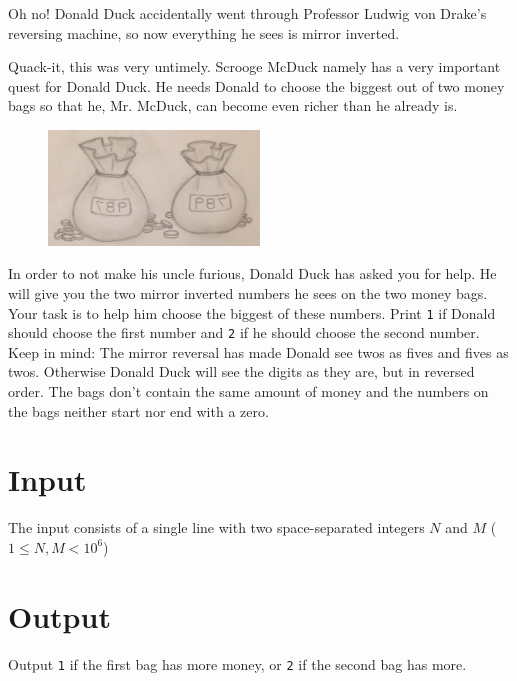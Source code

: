 Oh no! Donald Duck accidentally went through Professor Ludwig von Drake’s reversing machine, so now everything he sees is mirror inverted.

Quack-it, this was very untimely. Scrooge McDuck namely has a very important quest for Donald Duck. He needs Donald to choose the biggest out of two money bags so that he, Mr. McDuck, can become even richer than he already is.

\begin{figure}[!h]
\begin{center}
\includegraphics[width=0.5\textwidth]{moneybags.jpg}
\end{center}
\end{figure}

In order to not make his uncle furious, Donald Duck has asked you for help. He will give you the two
mirror inverted numbers he sees on the two money bags. Your task is to help him choose the biggest
of these numbers. Print \texttt{1} if Donald should choose the first number and \texttt{2} if he should choose the
second number. Keep in mind: The mirror reversal has made Donald see twos as fives and fives as twos.
Otherwise Donald Duck will see the digits as they are, but in reversed order. The bags don't
contain the same amount of money and the numbers on the bags neither start nor end with a zero.

\section*{Input}
The input consists of a single line with two space-separated integers $N$ and $M$ ($1
\leq N, M < 10^6$)

\section*{Output}
Output \texttt{1} if the first bag has more money, or \texttt{2} if the second bag has more.
